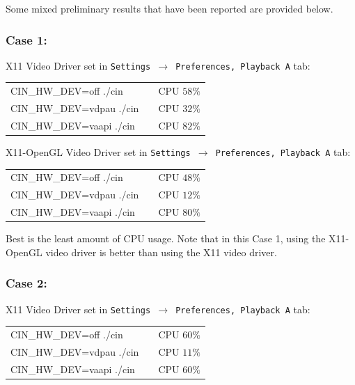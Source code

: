 Some mixed preliminary results that have been reported are provided below.

\subsubsection*{Case 1:}%
\label{ssub:case_1}

\noindent X11 Video Driver set in \texttt{Settings $\rightarrow$ Preferences, Playback A} tab:

\begin{center}
	\begin{tabular}{lcr}
		CIN\_HW\_DEV=off ./cin & &CPU $58\%$ \\
		CIN\_HW\_DEV=vdpau ./cin & &CPU $32\%$ \\
		CIN\_HW\_DEV=vaapi ./cin & &CPU $82\%$ \\
	\end{tabular}
\end{center}

\noindent X11-OpenGL Video Driver set in \texttt{Settings $\rightarrow$ Preferences, Playback A} tab:

\begin{center}
	\begin{tabular}{lcr}
		CIN\_HW\_DEV=off ./cin & &CPU $48\%$ \\
		CIN\_HW\_DEV=vdpau ./cin & &CPU $12\%$ \\
		CIN\_HW\_DEV=vaapi ./cin & &CPU $80\%$ \\
	\end{tabular}
\end{center}

\noindent Best is the least amount of CPU usage. Note that in this Case 1, using the X11-OpenGL video driver is  
better than using the X11 video driver.

\subsubsection*{Case 2:}%
\label{ssub:case_2}

\noindent X11 Video Driver set in \texttt{Settings $\rightarrow$ Preferences, Playback A} tab:

\begin{center}
	\begin{tabular}{lcr}
		CIN\_HW\_DEV=off ./cin & &CPU $60\%$ \\
		CIN\_HW\_DEV=vdpau ./cin & &CPU $11\%$ \\
		CIN\_HW\_DEV=vaapi ./cin & &CPU $60\%$ \\
	\end{tabular}
\end{center}

